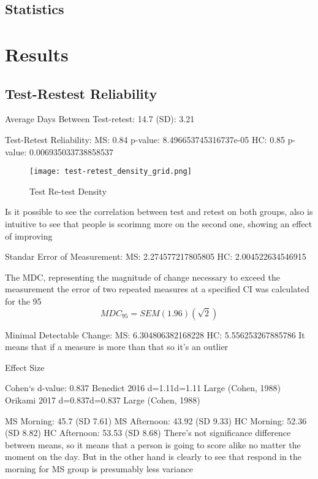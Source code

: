 \documentclass[letterpaper, 10 pt, conference]{ieeeconf}
\begin{document}
\subsection{Statistics}




\section{Results}
\vspace{2mm}

\subsection{Test-Restest Reliability}

Average Days Between Test-retest: 14.7 (SD): 3.21

Test-Retest Reliability:
 MS: 0.84   p-value: 8.496653745316737e-05
 HC: 0.85   p-value: 0.006935033738858537

\begin{figure}[ht]
\texttt{[image: test-retest\_density\_grid.png]}
\caption{Test Re-test Density}
\label{tab:density}
\end{figure}

Is it possible to see the correlation between test and retest on both groups, also is intuitive to see that people is scorimng more on the second one, showing an effect of improving

Standar Error of Measurement: 
 MS: 2.274577217805805
 HC: 2.004522634546915
 
 The MDC, representing the magnitude of change necessary to exceed the measurement the error of two repeated measures at a specified CI was calculated for the 95%
 $$MDC_{95} = SEM( 1.96 )(\sqrt{2})$$
 

 Minimal Detectable Change: 
 MS: 6.304806382168228 
 HC: 5.556253267885786
It means that if a measure is more than that so it's an outlier


Effect Size

Cohen`s d-value: 0.837
Benedict 2016	 d=1.11d=1.11 	Large (Cohen, 1988)
Orikami 2017	 d=0.837d=0.837 	Large (Cohen, 1988)

MS Morning: 45.7 (SD 7.61)
MS Afternoon: 43.92 (SD 9.33)
HC Morning: 52.36 (SD 8.82)
HC Afternoon: 53.53 (SD 8.68)
There's not significance difference between means, so it means that a person is going to score alike no matter the moment on the day. But in the other hand is clearly to see that respond in the morning for MS group is presumably less variance
\end{document}
